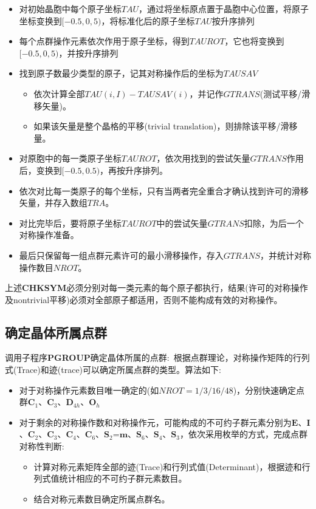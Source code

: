 \begin{itemize}
	\item 对初始晶胞中每个原子坐标$\mathit{TAU}$，通过将坐标原点置于晶胞中心位置，将原子坐标变换到$[-0.5,0,5)$，将标准化后的原子坐标$\mathit{TAU}$按升序排列
	\item 每个点群操作元素依次作用于原子坐标，得到$\mathit{TAUROT}$，它也将变换到$[-0.5,0,5)$，并按升序排列
	\item 找到原子数最少类型的原子，记其对称操作后的坐标为$\mathit{TAUSAV}$
		\begin{itemize}
			\item 依次计算全部$\mathit{TAU}(i,I)-\mathit{TAUSAV(i)}$，并记作$\mathit{GTRANS}$(测试平移/滑移矢量)。
			\item 如果该矢量是整个晶格的平移(\textrm{trivial translation})，则排除该平移/滑移量。
		\end{itemize}
	\item 对原胞中的每一类原子坐标$TAUROT$，依次用找到的尝试矢量$\mathit{GTRANS}$作用后，变换到$[-0.5,0.5)$，再按升序排列。
	\item 依次对比每一类原子的每个坐标，只有当两者完全重合才确认找到许可的滑移矢量，并存入数组$\mathit{TRA}$。
	\item 对比完毕后，要将原子坐标$TAUROT$中的尝试矢量$\mathit{GTRANS}$扣除，为后一个对称操作准备。
	\item 最后只保留每一组点群元素许可的最小滑移操作，存入$\mathit{GTRANS}$，并统计对称操作数目$\mathit{NROT}$。
\end{itemize}
上述\textbf{CHKSYM}必须分别对每一类元素的每个原子都执行，结果(许可的对称操作及nontrivial平移)必须对全部原子都适用，否则不能构成有效的对称操作。

\subsection{确定晶体所属点群}
调用子程序\textbf{PGROUP}确定晶体所属的点群:~根据点群理论，对称操作矩阵的行列式(\textrm{Trace})和迹(\textrm{trace})可以确定所属点群的类型。算法如下:~
\begin{itemize}
	\item 对于对称操作元素数目唯一确定的(如$\mathit{NROT}=1/3/16/48$)，分别快速确定点群$\mathbf{C}_1$、$\mathbf{C}_3$、$\mathbf{D}_{4h}$、$\mathbf{O}_h$
	\item 对于剩余的对称操作数和对称操作元，可能构成的不可约子群元素分别为$\mathbf{E}$、$\mathbf{I}$、$\mathbf{C}_2$、$\mathbf{C}_3$、$\mathbf{C}_4$、$\mathbf{C}_6$、$\mathbf{S}_2$=$\mathbf{m}$、$\mathbf{S}_6$、$\mathbf{S}_4$、$\mathbf{S}_3$，依次采用枚举的方式，完成点群对称性判断:~
		\begin{itemize}
			\item 计算对称元素矩阵全部的迹(\textrm{Trace})和行列式值(\textrm{Determinant})，根据迹和行列式值统计相应的不可约子群元素数目。
			\item 结合对称元素数目确定所属点群名。
		\end{itemize}
\end{itemize}

